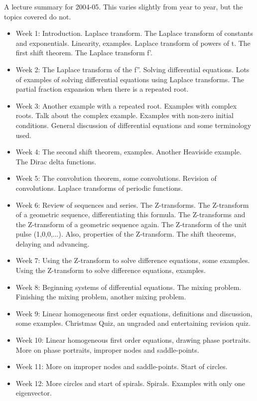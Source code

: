 \documentclass[12pt,a4wide]{article}
\begin{document}
 A lecture summary for 2004-05. This varies slightly from year to
 year, but the topics covered do not.
\begin{itemize}
\item Week 1: Introduction. Laplace transform. The Laplace transform of constants and exponentials. Linearity, examples. Laplace transform of powers of t. The first shift theorem. The Laplace transform f'.
\item Week 2: The Laplace transform of the f''. Solving differential equations. Lots of examples of solving differential equations using Laplace transforms. The partial fraction expansion when there is a repeated root.
\item Week 3: Another example with a repeated root. Examples with complex roots. Talk about the complex example. Examples with non-zero initial conditions. General discussion of differential equations and some terminology used.
\item Week 4: The second shift theorem, examples. Another Heaviside example. The Dirac delta functions.
\item Week 5: The convolution theorem, some convolutions. Revision of convolutions. Laplace transforms of periodic functions.
\item Week 6: Review of sequences and series. The Z-transforms. The Z-transform of a geometric sequence, differentiating this formula. The Z-transforms and the Z-transform of a geometric sequence again. The Z-transform of the unit pulse (1,0,0,...). Also, properties of the Z-transform. The shift theorems, delaying and advancing.
\item Week 7: Using the Z-transform to solve difference equations, some examples. Using the Z-transform to solve difference equations, examples.
\item Week 8: Beginning systems of differential equations. The mixing problem. Finishing the mixing problem, another mixing problem.
\item Week 9: Linear homogeneous first order equations, definitions and discussion, some examples. Christmas Quiz, an ungraded and entertaining revision quiz.
\item Week 10: Linear homogeneous first order equations, drawing phase portraits. More on phase portraits, improper nodes and saddle-points.
\item Week 11: More on improper nodes and saddle-points. Start of circles.
\item Week 12: More circles and start of spirals. Spirals. Examples with only one eigenvector.

\end{itemize}
\end{document}
